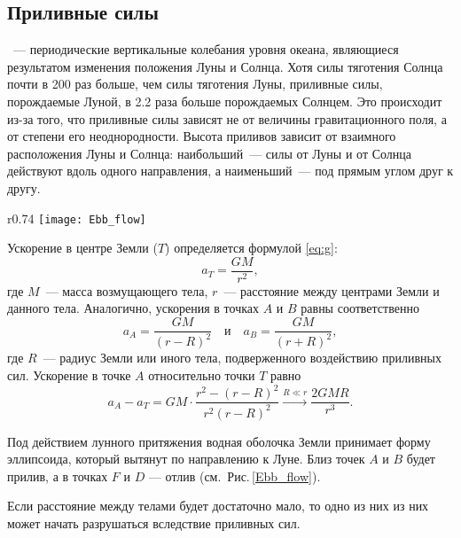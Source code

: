 \subsection{Приливные силы}

~--- периодические вертикальные колебания уровня океана, являющиеся результатом изменения положения Луны и Солнца. Хотя силы тяготения Солнца почти в 200 раз больше, чем силы тяготения Луны, приливные силы, порождаемые Луной, в 2.2 раза больше порождаемых Солнцем. Это происходит из-за того, что приливные силы зависят не от величины гравитационного поля, а от степени его неоднородности. Высота приливов зависит от взаимного расположения Луны и Солнца: наибольший~---  силы от Луны и от Солнца действуют вдоль одного направления, а наименьший~--- под прямым углом друг к другу.

\begin{wrapfigure}[11]{r}{0.74\tw}
	\vspace{-.5pc}
	\texttt{[image: Ebb\_flow]}
	\caption{К объяснению приливных сил}\label{Ebb_flow}
\end{wrapfigure}
Ускорение в центре Земли ($T$) определяется формулой \eqref{eq:g}:
\begin{equation*}
    a_T=\frac{G M}{r^2},
\end{equation*}
где $M$~--- масса возмущающего тела, $r$~--- расстояние между центрами Земли и данного тела. Аналогично, ускорения в точках $A$ и $B$ равны соответственно
\begin{equation}
	a_A = \frac{G M}{(r - R)^2} \quad \text{и} \quad a_B = \frac{GM}{(r + R)^2},
\end{equation}
где $R$~--- радиус Земли или иного тела, подверженного воздействию приливных сил. Ускорение в точке $A$ относительно точки $T$ равно
\begin{equation}
    a_A - a_T = GM \cdot \frac{r^2 - (r - R)^2}{r^2 (r - R)^2} \xrightarrow{R \ll r} \frac{2 G M R}{r^3}.
	\label{eq:ebb-force}
\end{equation}

Под действием лунного притяжения водная оболочка Земли принимает форму
эллипсоида, который вытянут по направлению к Луне. Близ точек $A$ и $B$ будет
прилив, а в точках $F$ и $D$ --- отлив (см.~Рис.\,\ref{Ebb_flow}).

Если расстояние между телами будет достаточно мало, то одно из них из них может начать разрушаться вследствие приливных сил.

